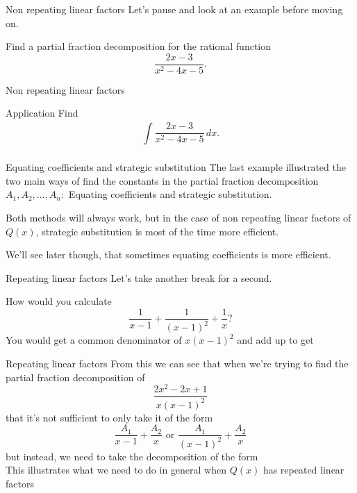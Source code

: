 \documentclass[presentation]{beamer}
\begin{document}
\begin{frame}[label={sec:org4168913}]{Non repeating linear factors}
Let's pause and look at an example before moving on.

Find a partial fraction decomposition for the rational function
\[
\frac{2x-3}{x^2 - 4x - 5}. \]
\vspace{10in}
\end{frame}

\begin{frame}[label={sec:orgd591597}]{Non repeating linear factors}
\end{frame}

\begin{frame}[label={sec:org2147e9c}]{Application}
Find
\[\int\limits_{}^{} \frac{2x-3}{x^2-4x-5}\,dx. \]
\vspace{10in}
\end{frame}

\begin{frame}[label={sec:orgba4fffe}]{Equating coefficients and strategic substitution}
The last example illustrated the two main ways of find the constants
in the partial fraction decomposition \(A_1,A_2,\ldots,A_n:\) Equating
coefficients and strategic substitution.

Both methods will always work, but in the case of non repeating linear
factors of \(Q(x)\), strategic substitution is most of the time more
efficient.

We'll see later though, that sometimes equating coefficients is more
efficient.
\end{frame}

\begin{frame}[label={sec:org276abaa}]{Repeating linear factors}
Let's take another break for a second.

How would you calculate
\[
\frac{1}{x-1} + \frac{1}{(x-1)^2} + \frac{1}{x}?\]
You would get a common denominator of \(x(x-1)^2\) and add up to get 
\[
\hspace{1in}\]
\end{frame}

\begin{frame}[label={sec:org219af7f}]{Repeating linear factors}
From this we can see that when we're trying to find the partial
fraction decomposition of \[ \frac{2x^2-2x+1}{x(x-1)^2} \] that it's
not sufficient to only take it of the form
\[
\frac{A_1}{x-1} + \frac{A_2}{x} \text{ or } \frac{A_1}{(x-1)^2} +
\frac{A_2}{x} \]
but instead, we need to take the decomposition of the form
\[
\hspace{1in} \]
This illustrates what we need to do in general when \(Q(x)\) has
repeated linear factors
\end{frame}
\end{document}
